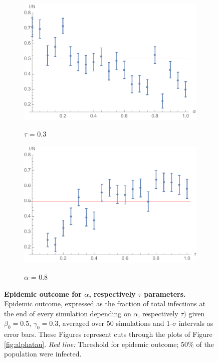 \documentclass[11pt]{article}
\begin{document}
\begin{figure}[t]
	\centering
	\begin{subfigure}[b]{0.78\textwidth}
    	\includegraphics[width=\textwidth]{Itot_alpha_tau03_omega1_beta05_gamma03_expk2_runs50_notitle.pdf}
        \label{fig:itotalpha}
        \caption{$\tau$ = 0.3}
	\end{subfigure}
 	\begin{subfigure}[b]{0.78\textwidth}
    	\includegraphics[width=\textwidth]{Itot_tau_alpha08_omega1_beta05_gamma03_expk2_runs50_notitle.pdf}
        \label{fig:itottau}
        \caption{$\alpha$ = 0.8}
	\end{subfigure}
    \caption{\textbf{Epidemic outcome for $\alpha$, respectively $\tau$ parameters.} Epidemic outcome, expressed as the fraction of total infections at the end of every simulation depending on $\alpha$, respectively $\tau)$ given $\beta_{0}=0.5$, $\gamma_{0}=0.3$, averaged over 50 simulations and 1-$\sigma$ intervals as error bars. These Figures represent cuts through the plots of Figure \ref{fig:alphatau}. \textit{Red line:} Threshold for epidemic outcome; 50\% of the population were infected.}
    \label{fig:itot}
\end{figure}
\end{document}
